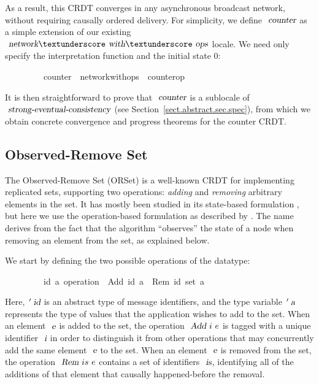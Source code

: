 As a result, this CRDT converges in any asynchronous broadcast network, without requiring causally ordered delivery.
For simplicity, we define $\isa{counter}$ as a simple extension of our existing $\isa{network}{\isacharunderscore}\isa{with}{\isacharunderscore}\isa{ops}$ locale.
We need only specify the interpretation function and the initial state 0:
\vspace{0.275em}
\begin{isabellebody}
\ \ \ \ \ \ \ \ \ counter\ {\isacharequal}\ network{\isacharunderscore}with{\isacharunderscore}ops\ {\isacharunderscore}\ counter{\isacharunderscore}op\ {}
\end{isabellebody}
\vspace{0.275em}
It is then straightforward to prove that $\isa{counter}$ is a sublocale of $\isa{strong-eventual-consistency}$ (see Section~\ref{sect.abstract.sec.spec}), from which we obtain concrete convergence and progress theorems for the counter CRDT.

\subsection{Observed-Remove Set}
\label{subsect.orset}

The Observed-Remove Set (ORSet) is a well-known CRDT for implementing replicated sets, supporting two operations: \emph{adding} and \emph{removing} arbitrary elements in the set.
It has mostly been studied in its state-based formulation \cite{Bieniusa:2012wu,Bieniusa:2012gt,Brown:2014hs,Zeller:2014fl}, but here we use the operation-based formulation as described by \citet{Shapiro:2011wy}.
The name derives from the fact that the algorithm ``observes'' the state of a node when removing an element from the set, as explained below.

We start by defining the two possible operations of the datatype:
\vspace{0.275em}
\begin{isabellebody}
\ \ \ \ \ \ \ \ \ {\isacharparenleft}{\isacharprime}id{\isacharcomma}\ {\isacharprime}a{\isacharparenright}\ operation\ {\isacharequal}\ Add\ {\isachardoublequoteopen}{\isacharprime}id{\isachardoublequoteclose}\ {\isachardoublequoteopen}{\isacharprime}a{\isachardoublequoteclose}\ {\isacharbar}\ Rem\ {\isachardoublequoteopen}{\isacharparenleft}{\isacharprime}id\ set{\isacharparenright}{\isachardoublequoteclose}\ {\isachardoublequoteopen}{\isacharprime}a{\isachardoublequoteclose}
\end{isabellebody}
\vspace{0.275em}
\noindent Here, $\isacharprime\isa{id}$ is an abstract type of message identifiers, and the type variable $\isacharprime\isa{a}$ represents the type of values that the application wishes to add to the set.
When an element $\isa{e}$ is added to the set, the operation $\isa{Add}\ i\ e$ is tagged with a unique identifier $\isa{i}$ in order to distinguish it from other operations that may concurrently add the same element $\isa{e}$ to the set.
When an element $\isa{e}$ is removed from the set, the operation $\isa{Rem}\ is\ e$ contains a set of identifiers $\isa{is}$, identifying all of the additions of that element that causally happened-before the removal.


